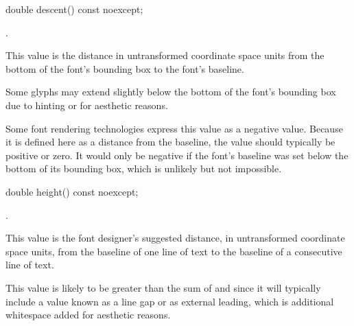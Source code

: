 \begin{itemdecl}
    double descent() const noexcept;
\end{itemdecl}
\begin{itemdescr}
	\pnum
	\returns
	.
	
	\pnum
	\remarks
	This value is the distance in untransformed coordinate space units from the bottom of the font's bounding box to the font's baseline.
	
	\pnum
	Some glyphs may extend slightly below the bottom of the font's bounding box due to hinting or for aesthetic reasons.
	
	\pnum
	\enternote
	Some font rendering technologies express this value as a negative value. Because it is defined here as a distance from the baseline, the value should typically be positive or zero. It would only be negative if the font's baseline was set below the bottom of its bounding box, which is unlikely but not impossible.
	\exitnote

\end{itemdescr}

\begin{itemdecl}
    double height() const noexcept;
\end{itemdecl}
\begin{itemdescr}
	\pnum
	\returns
	.
	
	\pnum
	\remarks
	This value is the font designer's suggested distance, in untransformed coordinate space units, from the baseline of one line of text to the baseline of a consecutive line of text.
	
	\pnum
	This value is likely to be greater than the sum of  and  since it will typically include a value known as a line gap or as external leading, which is additional whitespace added for aesthetic reasons.

\end{itemdescr}

